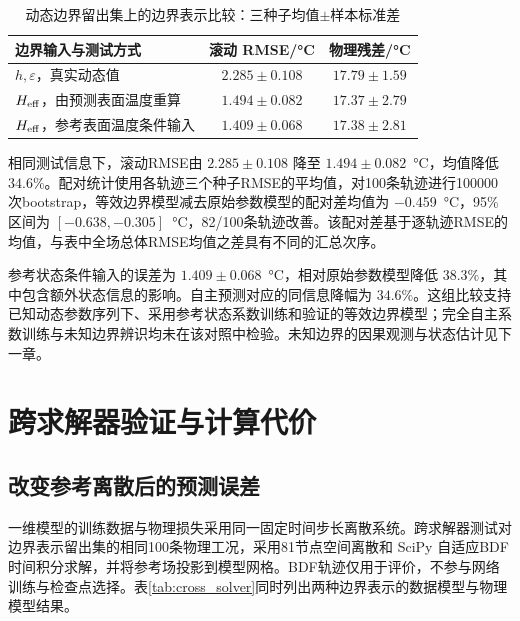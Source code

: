 \begin{table}[H]
  \centering
  \caption{动态边界留出集上的边界表示比较：三种子均值$\pm$样本标准差}
  \label{tab:heff_results}
  \begin{tabular}{lcc}
    \toprule
    边界输入与测试方式 & 滚动 RMSE/\si{\degreeCelsius} & 物理残差/\si{\degreeCelsius} \\
    \midrule
    $h,\varepsilon$，真实动态值 & $2.285\pm0.108$ & $17.79\pm1.59$ \\
    ${H_{\mathrm{eff}}}$，由预测表面温度重算 & $1.494\pm0.082$ & $17.37\pm2.79$ \\
    ${H_{\mathrm{eff}}}$，参考表面温度条件输入 & $1.409\pm0.068$ & $17.38\pm2.81$ \\
    \bottomrule
  \end{tabular}
\end{table}

相同测试信息下，滚动RMSE由 $2.285\pm0.108$ 降至 $1.494\pm0.082$~\si{\degreeCelsius}，均值降低 $34.6\%$。配对统计使用各轨迹三个种子RMSE的平均值，对100条轨迹进行100000次bootstrap，等效边界模型减去原始参数模型的配对差均值为 \SI{-0.459}{\degreeCelsius}，95\%区间为 $[-0.638,-0.305]$~\si{\degreeCelsius}，82/100条轨迹改善。该配对差基于逐轨迹RMSE的均值，与表中全场总体RMSE均值之差具有不同的汇总次序。

参考状态条件输入的误差为 $1.409\pm0.068$~\si{\degreeCelsius}，相对原始参数模型降低 $38.3\%$，其中包含额外状态信息的影响。自主预测对应的同信息降幅为 $34.6\%$。这组比较支持已知动态参数序列下、采用参考状态系数训练和验证的等效边界模型；完全自主系数训练与未知边界辨识均未在该对照中检验。未知边界的因果观测与状态估计见下一章。

\section{跨求解器验证与计算代价}

\subsection{改变参考离散后的预测误差}

一维模型的训练数据与物理损失采用同一固定时间步长离散系统。跨求解器测试对边界表示留出集的相同100条物理工况，采用81节点空间离散和 SciPy 自适应BDF时间积分求解，并将参考场投影到模型网格。BDF轨迹仅用于评价，不参与网络训练与检查点选择。表\ref{tab:cross_solver}同时列出两种边界表示的数据模型与物理模型结果。

